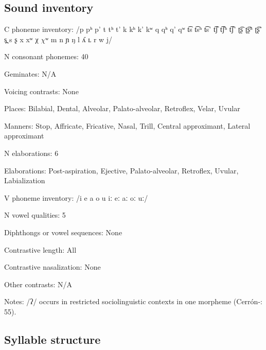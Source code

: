 {\subsection*{Sound inventory}
\begin{appendixdesc}

\item[C phoneme inventory:] /p pʰ p’ t tʰ t’ k kʰ k’ kʷ q qʰ q’ qʷ t͡s t͡sʰ t͡s’ t͡ʃ t͡ʃʰ t͡ʃ’ ʈ͡ʂ ʈ͡ʂʰ ʈ͡ʂ’ s̪ s ʂ x xʷ χ $\chi ʷ$ m n ɲ ŋ l ʎ ʟ r w j/

\item[N consonant phonemes:] 40

\item[Geminates:] N/A

\item[Voicing contrasts:] None

\item[Places:] Bilabial, Dental, Alveolar, Palato-alveolar, Retroflex, Velar, Uvular

\item[Manners:] Stop, Affricate, Fricative, Nasal, Trill, Central approximant, Lateral approximant

\item[N elaborations:] 6

\item[Elaborations:] Post-aspiration, Ejective, Palato-alveolar, Retroflex, Uvular, Labialization

\item[V phoneme inventory:] /i e a o u iː eː aː oː uː/

\item[N vowel qualities:] 5

\item[Diphthongs or vowel sequences:] None

\item[Contrastive length:] All

\item[Contrastive nasalization:] None

\item[Other contrasts:] N/A

\item[Notes:] /ʔ/ occurs in restricted sociolinguistic contexts in one morpheme (Cerrón-\citealt{Palomino2006}: 55).
\end{appendixdesc}
\subsection*{Syllable structure}
\begin{appendixdesc}


\end{appendixdesc}}
